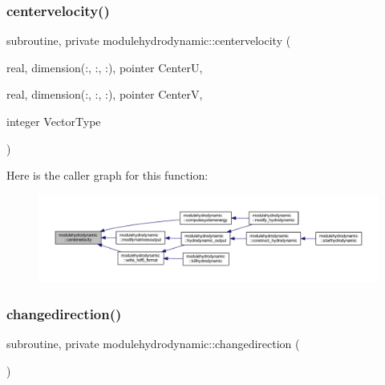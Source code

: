 \subsubsection{\texorpdfstring{centervelocity()}{centervelocity()}}
{\footnotesize\ttfamily subroutine, private modulehydrodynamic\+::centervelocity (\begin{DoxyParamCaption}\item[{real, dimension(\+:, \+:, \+:), pointer}]{CenterU,  }\item[{real, dimension(\+:, \+:, \+:), pointer}]{CenterV,  }\item[{integer}]{Vector\+Type }\end{DoxyParamCaption})\hspace{0.3cm}{\ttfamily [private]}}

Here is the caller graph for this function\+:\nopagebreak
\begin{figure}[H]
\begin{center}
\leavevmode
\includegraphics[width=350pt]{namespacemodulehydrodynamic_a7bcb9032bfe7bf84ef03ab8c66f0f159_icgraph}
\end{center}
\end{figure}
\mbox{\label{namespacemodulehydrodynamic_a21da40cf926fb3d12ccc40743a115da6}} 
\subsubsection{\texorpdfstring{changedirection()}{changedirection()}}
{\footnotesize\ttfamily subroutine, private modulehydrodynamic\+::changedirection (\begin{DoxyParamCaption}{ }\end{DoxyParamCaption})\hspace{0.3cm}{\ttfamily [private]}}

